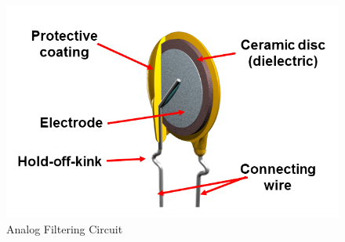 \begin{figure}
\includegraphics[keepaspectratio=true,scale=.5]{./figures/parameters/analogFiltering.png}
\centering
\caption{Analog Filtering Circuit}
\label{analogFiltering}
\end{figure}

